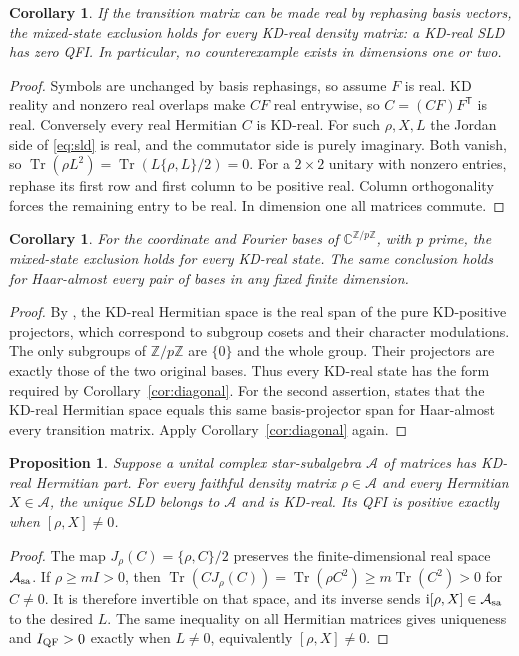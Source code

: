\documentclass[11pt]{article}
\newcommand{\Tr}{\operatorname{Tr}}
\newcommand{\ii}{\mathrm{i}}
\newtheorem{corollary}[theorem]{Corollary}
\newtheorem{proposition}[theorem]{Proposition}
\begin{document}
\begin{corollary}\label{cor:real}
If the transition matrix can be made real by rephasing basis vectors,
the mixed-state exclusion holds for every KD-real density matrix:
a KD-real SLD has zero QFI. In particular, no counterexample exists
in dimensions one or two.
\end{corollary}
\begin{proof}
Symbols are unchanged by basis rephasings, so assume $F$ is real.
KD reality and nonzero real overlaps make $CF$ real entrywise, so
$C=(CF)F^{\mathsf T}$ is real. Conversely every real Hermitian $C$ is
KD-real. For such $\rho,X,L$ the Jordan side of \eqref{eq:sld} is real,
and the commutator side is purely imaginary. Both vanish, so
$\Tr(\rho L^2)=\Tr(L\{\rho,L\}/2)=0$.
For a $2\times2$ unitary with nonzero entries, rephase its first row
and first column to be positive real. Column orthogonality forces the
remaining entry to be real. In dimension one all matrices commute.
\end{proof}

\begin{corollary}\label{cor:prime}
For the coordinate and Fourier bases of $\mathbb C^{\mathbb Z/p\mathbb Z}$,
with $p$ prime, the mixed-state exclusion holds for every KD-real state.
The same conclusion holds for Haar-almost every pair of bases in any
fixed finite dimension.
\end{corollary}
\begin{proof}
By \cite[Theorems 3.1 and 4.1]{fourier}, the KD-real Hermitian space is
the real span of the pure KD-positive projectors, which correspond to
subgroup cosets and their character modulations. The only subgroups of
$\mathbb Z/p\mathbb Z$ are $\{0\}$ and the whole group. Their projectors
are exactly those of the two original bases. Thus every KD-real state
has the form required by Corollary~\ref{cor:diagonal}.
For the second assertion, \cite[Theorem 1, (7)]{generic} states that the
KD-real Hermitian space equals this same basis-projector span for
Haar-almost every transition matrix. Apply Corollary~\ref{cor:diagonal} again.
\end{proof}

\begin{proposition}\label{prop:algebra}
Suppose a unital complex star-subalgebra $\mathcal A$ of matrices has
KD-real Hermitian part. For every faithful density matrix
$\rho\in\mathcal A$ and every Hermitian $X\in\mathcal A$, the unique SLD
belongs to $\mathcal A$ and is KD-real. Its QFI is positive exactly when
$[\rho,X]\ne0$.
\end{proposition}
\begin{proof}
The map $J_\rho(C)=\{\rho,C\}/2$ preserves the finite-dimensional real
space $\mathcal A_{\rm sa}$. If $\rho\ge mI>0$, then
$\Tr(CJ_\rho(C))=\Tr(\rho C^2)\ge m\Tr(C^2)>0$ for $C\ne0$.
It is therefore invertible on that space, and its inverse sends
$\ii[\rho,X]\in\mathcal A_{\rm sa}$ to the desired $L$.
The same inequality on all Hermitian matrices gives uniqueness and
$I_{\rm QF}>0$ exactly when $L\ne0$, equivalently $[\rho,X]\ne0$.
\end{proof}
\end{document}
